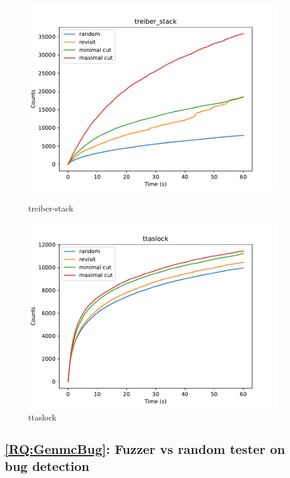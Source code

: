 \begin{figure}[h!]
	\begin{minipage}{0.45\textwidth}
		\centering
		\includegraphics[width=\textwidth]{figure/genmc-time/treiber_stack.pdf}
		\caption{treiber-stack}
		\label{genmc:treiber_stack-time}
	\end{minipage}
	\hfill
	\begin{minipage}{0.45\textwidth}
		\centering
		\includegraphics[width=\textwidth]{figure/genmc-time/ttaslock.pdf}
		\caption{ttaslock}
		\label{genmc:ttaslock-time}
	\end{minipage}
\end{figure}

\subsection{\ref*{RQ:GenmcBug}: Fuzzer vs random tester on bug detection}

